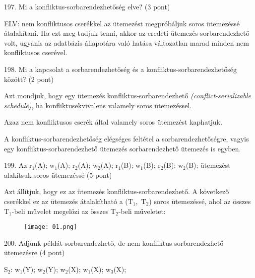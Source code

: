 \documentclass[a4paper,11.5pt, table]{article}
\begin{document}
197. Mi a konfliktus-sorbarendezhetőség elve? (3 pont)
	\begin{compactitem}
		\item ELV: nem konfliktusos cserékkel az ütemezést megpróbáljuk soros ütemezéssé átalakítani. Ha ezt meg tudjuk tenni, akkor az eredeti ütemezés sorbarendezhető volt, ugyanis az adatbázis állapotára való hatása változatlan marad minden nem konfliktusos cserével.
	\end{compactitem}

198. Mi a kapcsolat a sorbarendezhetőség és a konfliktus-sorbarendezhetőség között? (2 pont)
	\begin{compactitem}
		\item Azt mondjuk, hogy egy ütemezés konfliktus-sorbarendezhető \textit{(conflict-serializable schedule)}, ha konfliktusekvivalens valamely soros ütemezéssel. 
		\begin{compactitem}
			\item Azaz nem konfliktusos cserék által valamely soros ütemezést kaphatjuk.
		\end{compactitem}
		
		\item A konfliktus-sorbarendezhetőség elégséges feltétel a sorbarendezhetőségre, vagyis egy konfliktus-sorbarendezhető ütemezés sorbarendezhető ütemezés is egyben. 
	\end{compactitem}

199. Az r$ _{1} $(A); w$ _{1} $(A); r$ _{2} $(A); w$ _{2} $(A); r$ _{1} $(B); w$ _{1} $(B); r$ _{2} $(B); w$ _{2} $(B); ütemezést alakítsuk soros ütemezéssé (5 pont)
	\begin{compactitem}
		\item Azt állítjuk, hogy ez az ütemezés konfliktus-sorbarendezhető. A következő cserékkel ez az ütemezés átalakítható a (T$ _{1} $, T$ _{2} $) soros ütemezéssé, ahol az összes T$ _{1} $-beli művelet megelőzi az összes T$ _{2} $-beli műveletet:
	\end{compactitem}
\begin{figure}[h]
	\centering
	\texttt{[image: 01.png]}
\end{figure}

200. Adjunk példát sorbarendezhető, de nem konfliktus-sorbarendezhető ütemezésre (4 pont)
	\begin{compactitem}
		\item S$ _{2} $: w$ _{1} $(Y); w$ _{2} $(Y); w$ _{2} $(X); w$ _{1} $(X); w$ _{3} $(X);
	\end{compactitem}
\end{document}
